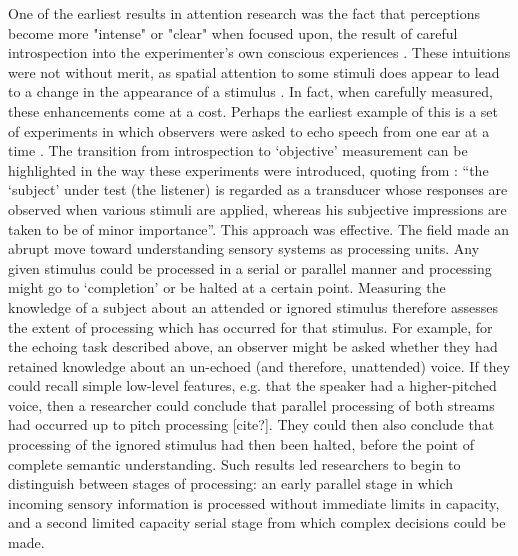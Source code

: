One of the earliest results in attention research was the fact that perceptions become more "intense" or "clear" when focused upon, the result of careful introspection into the experimenter's own conscious experiences \citep{Helmholtz1924-rl,James1981-cj,Kuelpe1902-qz,Titchener1908-bx}. These intuitions were not without merit, as spatial attention to some stimuli does appear to lead to a change in the appearance of a stimulus \citep{Carrasco2018-sb}. In fact, when carefully measured, these enhancements come at a cost. Perhaps the earliest example of this is a set of experiments in which observers were asked to echo speech from one ear at a time \citep{Cherry1953-as}. The transition from introspection to ‘objective’ measurement can be highlighted in the way these experiments were introduced, quoting from \citet{Cherry1953-as}: ``the `subject' under test (the listener) is regarded as a transducer whose responses are observed when various stimuli are applied, whereas his subjective impressions are taken to be of minor importance''. This approach was effective. The field made an abrupt move toward understanding sensory systems as processing units. Any given stimulus could be processed in a serial or parallel manner and processing might go to `completion' or be halted at a certain point. Measuring the knowledge of a subject about an attended or ignored stimulus therefore assesses the extent of processing which has occurred for that stimulus. For example, for the echoing task described above, an observer might be asked whether they had retained knowledge about an un-echoed (and therefore, unattended) voice. If they could recall simple low-level features, e.g. that the speaker had a higher-pitched voice, then a researcher could conclude that parallel processing of both streams had occurred up to pitch processing [cite?]. They could then also conclude that processing of the ignored stimulus had then been halted, before the point of complete semantic understanding. Such results led researchers to begin to distinguish between stages of processing: an early parallel stage in which incoming sensory information is processed without immediate limits in capacity, and a second limited capacity serial stage from which complex decisions could be made.

